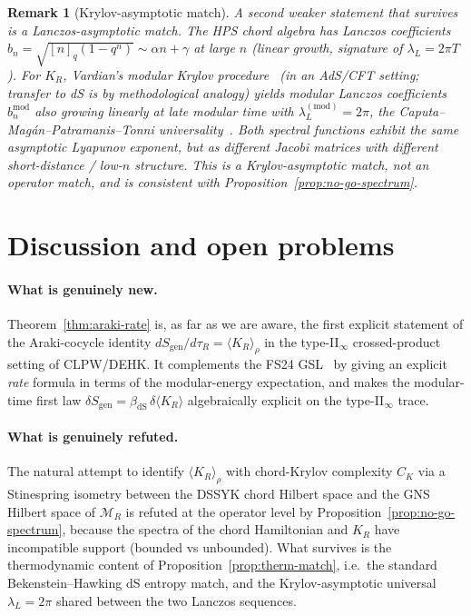 \documentclass[12pt,a4paper]{article}
\newtheorem{remark}{Remark}
\theoremstyle{definition}
\begin{document}
\begin{remark}[Krylov-asymptotic match]
A second weaker statement that survives is a Lanczos-asymptotic match.
The HPS chord algebra has Lanczos coefficients
$b_n = \sqrt{[n]_q(1-q^n)}\sim\alpha n + \gamma$ at large $n$ (linear
growth, signature of $\lambda_L = 2\pi T$). For $K_R$, Vardian's modular
Krylov procedure~\cite{Vardian2026} (in an AdS/CFT setting; transfer to
dS is by methodological analogy) yields modular Lanczos coefficients
$b_n^{\mathrm{mod}}$ also growing linearly at late modular time with
$\lambda_L^{(\mathrm{mod})} = 2\pi$, the
Caputa--Mag\'{a}n--Patramanis--Tonni
universality~\cite{CMPT2023}. Both spectral functions exhibit the same
asymptotic Lyapunov exponent, but as different Jacobi matrices with
different short-distance / low-$n$ structure. This is a Krylov-asymptotic
match, not an operator match, and is consistent with
Proposition~\ref{prop:no-go-spectrum}.
\end{remark}

\section{Discussion and open problems}
\label{sec:discussion}

\paragraph{What is genuinely new.} Theorem~\ref{thm:araki-rate} is, as
far as we are aware, the first explicit statement of the
Araki-cocycle identity $dS_{\mathrm{gen}}/d\tau_R = \langle K_R\rangle_\rho$
in the type-II$_\infty$ crossed-product setting of CLPW/DEHK. It
complements the FS24 GSL~\cite{FaulknerSperanza2024} by giving an
explicit \emph{rate} formula in terms of the modular-energy
expectation, and makes the modular-time first law
$\delta S_{\mathrm{gen}} = \beta_{\mathrm{dS}}\,\delta\langle K_R\rangle$
algebraically explicit on the type-II$_\infty$ trace.

\paragraph{What is genuinely refuted.} The natural attempt to identify
$\langle K_R\rangle_\rho$ with chord-Krylov complexity $C_K$ via a
Stinespring isometry between the DSSYK chord Hilbert space and the GNS
Hilbert space of $\mathcal{M}_R$ is refuted at the operator level by
Proposition~\ref{prop:no-go-spectrum}, because the spectra of the
chord Hamiltonian and $K_R$ have incompatible support (bounded vs
unbounded). What survives is the thermodynamic content of
Proposition~\ref{prop:therm-match}, i.e.\ the standard
Bekenstein--Hawking dS entropy match, and the Krylov-asymptotic
universal $\lambda_L = 2\pi$ shared between the two Lanczos sequences.
\end{document}
